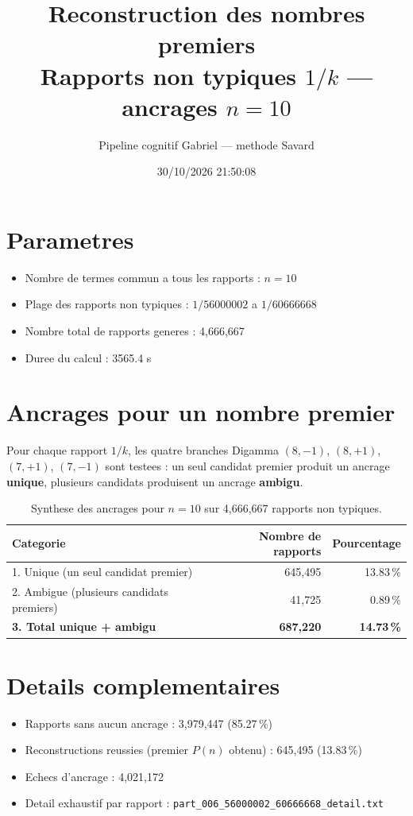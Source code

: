 \documentclass[12pt]{article}
\title{Reconstruction des nombres premiers\\Rapports non typiques $1/k$ --- ancrages $n=10$
}
\author{Pipeline cognitif Gabriel --- methode Savard}
\date{30/10/2026 21:50:08}
\begin{document}
\maketitle

\section*{Parametres}
\begin{itemize}
\item Nombre de termes commun a tous les rapports : $n=10$
\item Plage des rapports non typiques : $1/56000002$ a $1/60666668$
\item Nombre total de rapports generes : 4,666,667
\item Duree du calcul : 3565.4 s
\end{itemize}

\section*{Ancrages pour un nombre premier}

Pour chaque rapport $1/k$, les quatre branches Digamma $(8,-1)$, $(8,+1)$, $(7,+1)$, $(7,-1)$ sont testees : un seul candidat premier produit un ancrage \textbf{unique}, plusieurs candidats produisent un ancrage \textbf{ambigu}.

\begin{table}[h!]
\centering
\caption{Synthese des ancrages pour $n=10$ sur 4,666,667 rapports non typiques.}
\begin{tabular}{lrr}
\toprule
\textbf{Categorie} & \textbf{Nombre de rapports} & \textbf{Pourcentage} \\
\midrule
1. Unique (un seul candidat premier) & 645,495 & 13.83\,\% \\
2. Ambigue (plusieurs candidats premiers) & 41,725 & 0.89\,\% \\
\midrule
\textbf{3. Total unique + ambigu} & \textbf{687,220} & \textbf{14.73\,\%} \\
\bottomrule
\end{tabular}
\end{table}

\section*{Details complementaires}
\begin{itemize}
\item Rapports sans aucun ancrage : 3,979,447 (85.27\,\%)
\item Reconstructions reussies (premier $P(n)$ obtenu) : 645,495 (13.83\,\%)
\item Echecs d'ancrage : 4,021,172
\item Detail exhaustif par rapport : \texttt{part_006_56000002_60666668_detail.txt}
\end{itemize}
\end{document}
